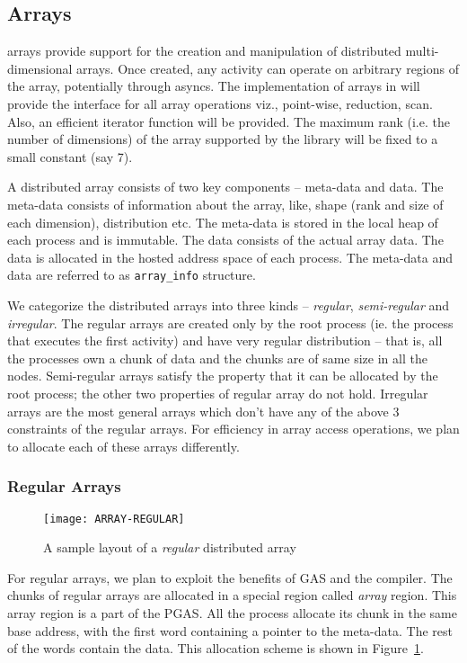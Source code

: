 \subsection{Arrays}

\Xten{} arrays provide support for the creation and manipulation of
distributed multi-dimensional arrays. Once created, any activity can
operate on arbitrary regions of the array, potentially through asyncs. The
implementation of \Xten{} arrays in \Xtenlib{} will provide the
interface for all \Xten{} array operations viz., point-wise, reduction,
scan. Also, an efficient iterator function will be provided. The maximum rank
(i.e. the number of dimensions) of the array supported by
the library will be fixed to a small constant (say 7). 

A distributed array consists of two key components -- meta-data and
data. The meta-data consists of information about the array, like,
shape (rank and size of each dimension), distribution etc. 
The meta-data is stored in the local heap of each process and
is immutable.
The data consists of the actual array data. The data is allocated
in the hosted address space of each process. The meta-data and
data are referred to as {\tt array\_info} structure.  

We categorize the distributed arrays into three kinds -- {\em regular},
{\em semi-regular} and {\em irregular}. The regular arrays are created
only by the root process (ie. the process that executes the first
activity) and have very regular distribution -- that is,
all the processes own a chunk of data and the chunks are of same size
in all the nodes. Semi-regular arrays satisfy the property that it can
be allocated by the root process; the other two properties of regular array
do not hold. Irregular arrays are the most
general arrays which don't have any of the above 3 constraints of the 
regular arrays. For efficiency in array access operations,
we plan to allocate each of these arrays differently.

\subsubsection{Regular Arrays}
\begin{figure}
\center
\texttt{[image: ARRAY-REGULAR]}
\caption{A sample layout of a {\em regular} distributed array}
\label{fig:array_layout_regular}
\end{figure}

For regular arrays, we plan to exploit the benefits of GAS and the compiler.
The chunks of regular arrays are allocated in a special region called {\em array}
region. This array region is a part of the PGAS. All the process allocate its
chunk in the same base address, with the first word containing a pointer to 
the meta-data. The rest of the words contain the data. This allocation scheme is shown in Figure~\ref{fig:array_layout_regular}.


